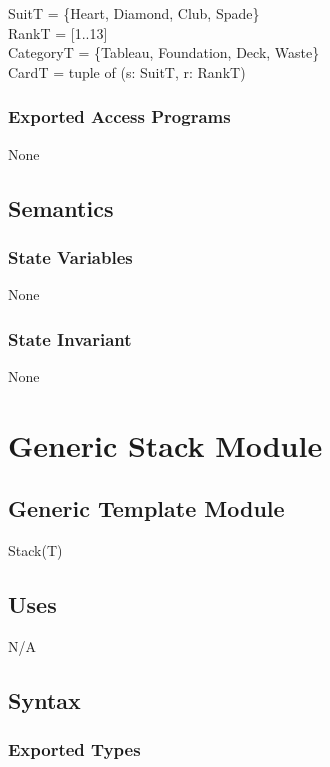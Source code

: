 \documentclass[12pt]{article}
\begin{document}
SuitT = \{Heart, Diamond, Club, Spade\}\\ 
RankT = [1..13]\\
CategoryT = \{Tableau, Foundation, Deck, Waste\}\\
CardT = tuple of (s: SuitT, r: RankT)

\subsubsection* {Exported Access Programs}

None

\subsection* {Semantics}

\subsubsection* {State Variables}

None

\subsubsection* {State Invariant}

None

\newpage

\section* {Generic Stack Module}

\subsection* {Generic Template Module}

Stack(T)

\subsection* {Uses}

N/A

\subsection* {Syntax}

\subsubsection* {Exported Types}
\end{document}
